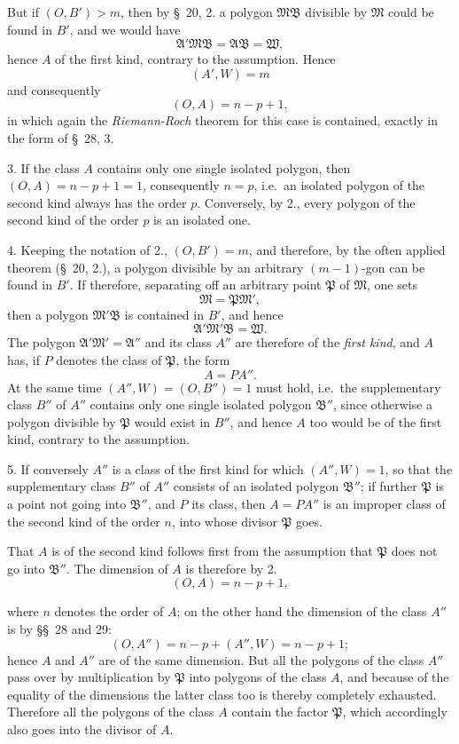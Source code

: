\documentclass{article}
\begin{document}
But if $(O, B') > m$, then by §~20, 2. a polygon $\mathfrak{M}\mathfrak{B}$ divisible by $\mathfrak{M}$ could be found in $B'$, and we would have
\[ \mathfrak{A}'\mathfrak{M}\mathfrak{B} = \mathfrak{A}\mathfrak{B} = \mathfrak{W}, \]
hence $A$ of the first kind, contrary to the assumption. Hence
\[ (A', W) = m \]
and consequently
\[ (O, A) = n-p+1, \]
in which again the \emph{Riemann-Roch} theorem for this case is contained, exactly in the form of §~28, 3.

3. If the class $A$ contains only one single isolated polygon, then $(O, A) = n-p+1 = 1$, consequently $n = p$, i.e.\ an isolated polygon of the second kind always has the order $p$. Conversely, by 2., every polygon of the second kind of the order $p$ is an isolated one.

4. Keeping the notation of 2., $(O, B') = m$, and therefore, by the often applied theorem (§~20, 2.), a polygon divisible by an arbitrary $(m-1)$-gon can be found in $B'$. If therefore, separating off an arbitrary point $\mathfrak{P}$ of $\mathfrak{M}$, one sets
\[ \mathfrak{M} = \mathfrak{P}\mathfrak{M}', \]
then a polygon $\mathfrak{M}'\mathfrak{B}$ is contained in $B'$, and hence
\[ \mathfrak{A}'\mathfrak{M}'\mathfrak{B} = \mathfrak{W}. \]
The polygon $\mathfrak{A}'\mathfrak{M}' = \mathfrak{A}''$ and its class $A''$ are therefore of the \emph{first kind}, and $A$ has, if $P$ denotes the class of $\mathfrak{P}$, the form
\[ A = PA''. \]
At the same time $(A'', W) = (O, B'') = 1$ must hold, i.e.\ the supplementary class $B''$ of $A''$ contains only one single isolated polygon $\mathfrak{B}''$, since otherwise a polygon divisible by $\mathfrak{P}$ would exist in $B''$, and hence $A$ too would be of the first kind, contrary to the assumption.

5. If conversely $A''$ is a class of the first kind for which $(A'', W) = 1$, so that the supplementary class $B''$ of $A''$ consists of an isolated polygon $\mathfrak{B}''$; if further $\mathfrak{P}$ is a point not going into $\mathfrak{B}''$, and $P$ its class, then $A = PA''$ is an improper class of the second kind of the order $n$, into whose divisor $\mathfrak{P}$ goes.

That $A$ is of the second kind follows first from the assumption that $\mathfrak{P}$ does not go into $\mathfrak{B}''$. The dimension of $A$ is therefore by 2.
\[ (O, A) = n-p+1, \]

where $n$ denotes the order of $A$; on the other hand the dimension of the class $A''$ is by §§~28 and 29:
\[ (O, A'') = n-p+(A'', W) = n-p+1; \]
hence $A$ and $A''$ are of the same dimension. But all the polygons of the class $A''$ pass over by multiplication by $\mathfrak{P}$ into polygons of the class $A$, and because of the equality of the dimensions the latter class too is thereby completely exhausted. Therefore all the polygons of the class $A$ contain the factor $\mathfrak{P}$, which accordingly also goes into the divisor of $A$.
\end{document}
